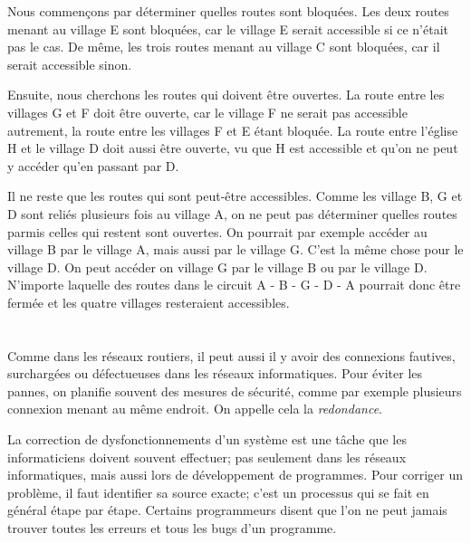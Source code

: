 {{{\centering%
\par}

Nous commençons par déterminer quelles routes sont bloquées. Les deux routes menant au village E sont bloquées, car le village E serait accessible si ce n’était pas le cas. De même, les trois routes menant au village C sont bloquées, car il serait accessible sinon.

Ensuite, nous cherchons les routes qui doivent être ouvertes. La route entre les villages G et F doit être ouverte, car le village F ne serait pas accessible autrement, la route entre les villages F et E étant bloquée. La route entre l’église H et le village D doit aussi être ouverte, vu que H est accessible et qu’on ne peut y accéder qu’en passant par D.

Il ne reste que les routes qui sont peut-être accessibles. Comme les village B, G et D sont reliés plusieurs fois au village A, on ne peut pas déterminer quelles routes parmis celles qui restent sont ouvertes. On pourrait par exemple accéder au village B par le village A, mais aussi par le village G. C’est la même chose pour le village D. On peut accéder on village G par le village B ou par le village D. N’importe laquelle des routes dans le circuit A - B - G - D - A pourrait donc être fermée et les quatre villages resteraient accessibles.



\section*{\BrochureItsInformatics}
Comme dans les réseaux routiers, il peut aussi il y avoir des connexions fautives, surchargées ou défectueuses dans les réseaux informatiques. Pour éviter les pannes, on planifie souvent des mesures de sécurité, comme par exemple plusieurs connexion menant au même endroit. On appelle cela la \emph{redondance}.

La correction de dysfonctionnements d’un système est une tâche que les informaticiens doivent souvent effectuer; pas seulement dans les réseaux informatiques, mais aussi lors de développement de programmes. Pour corriger un problème, il faut identifier sa source exacte; c’est un processus qui se fait en général étape par étape. Certains programmeurs disent que l’on ne peut jamais trouver toutes les erreurs et tous les bugs d’un programme.



}}
